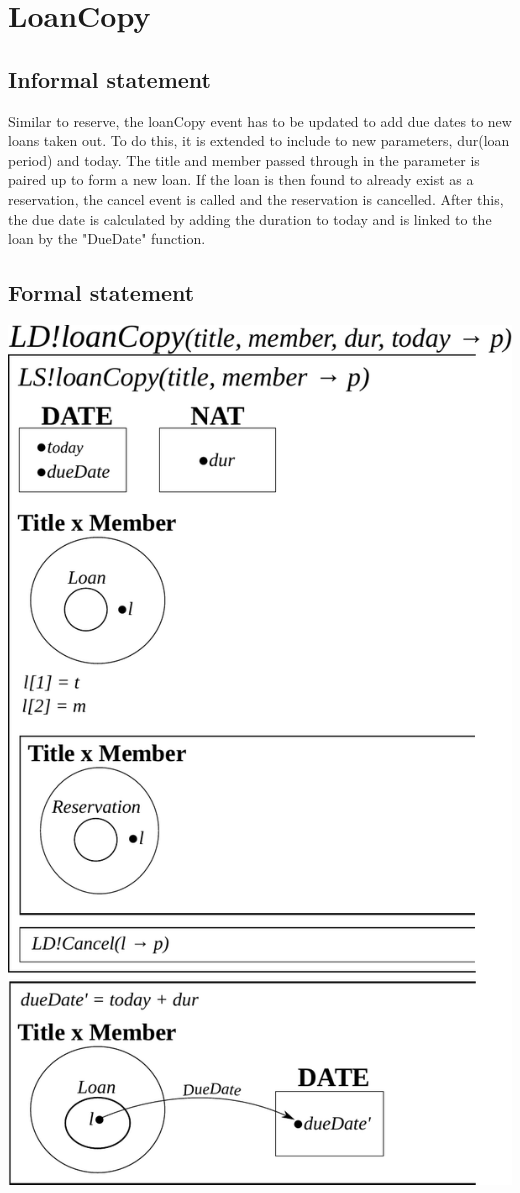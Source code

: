 \documentclass[]{report}
\begin{document}
\section{LoanCopy}
\subsection{Informal statement}
Similar to reserve, the loanCopy event has to be updated to add due dates to new loans taken out. To do this, it is extended to include to new parameters, dur(loan period) and today. The title and member passed through in the parameter is paired up to form a new loan. If the loan is then found to already exist as a reservation, the cancel event is called and the reservation is cancelled. After this, the due date is calculated by adding the duration to today and is linked to the loan by the "DueDate" function.
\subsection{Formal statement}
\begin{center}
	\includegraphics[scale=0.75]{loan_copy.pdf}
\end{center}
\newpage
\end{document}
